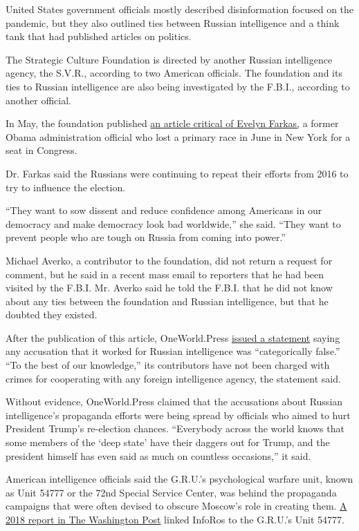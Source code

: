 United States government officials mostly described disinformation
focused on the pandemic, but they also outlined ties between Russian
intelligence and a think tank that had published articles on politics.

The Strategic Culture Foundation is directed by another Russian
intelligence agency, the S.V.R., according to two American officials.
The foundation and its ties to Russian intelligence are also being
investigated by the F.B.I., according to another official.

In May, the foundation published
\href{https://www.strategic-culture.org/news/2020/05/24/what-evelyn-fakas-trey-gowdy-and-some-others-dubiously-have-in-common/}{an
article critical of Evelyn Farkas,} a former Obama administration
official who lost a primary race in June in New York for a seat in
Congress.

Dr. Farkas said the Russians were continuing to repeat their efforts
from 2016 to try to influence the election.

``They want to sow dissent and reduce confidence among Americans in our
democracy and make democracy look bad worldwide,'' she said. ``They want
to prevent people who are tough on Russia from coming into power.''

Michael Averko, a contributor to the foundation, did not return a
request for comment, but he said in a recent mass email to reporters
that he had been visited by the F.B.I. Mr. Averko said he told the
F.B.I. that he did not know about any ties between the foundation and
Russian intelligence, but that he doubted they existed.

After the publication of this article, OneWorld.Press
\href{http://oneworld.press/?module=articles\&action=view\&id=1603}{issued
a statement} saying any accusation that it worked for Russian
intelligence was ``categorically false.'' ``To the best of our
knowledge,'' its contributors have not been charged with crimes for
cooperating with any foreign intelligence agency, the statement said.

Without evidence, OneWorld.Press claimed that the accusations about
Russian intelligence's propaganda efforts were being spread by officials
who aimed to hurt President Trump's re-election chances. ``Everybody
across the world knows that some members of the `deep state' have their
daggers out for Trump, and the president himself has even said as much
on countless occasions,'' it said.

American intelligence officials said the G.R.U.'s psychological warfare
unit, known as Unit 54777 or the 72nd Special Service Center, was behind
the propaganda campaigns that were often devised to obscure Moscow's
role in creating them.
\href{https://www.washingtonpost.com/world/europe/how-russias-military-intelligence-agency-became-the-covert-muscle-in-putins-duels-with-the-west/2018/12/27/2736bbe2-fb2d-11e8-8c9a-860ce2a8148f_story.html}{A
2018 report in The Washington Post} linked InfoRos to the G.R.U.'s Unit
54777.


